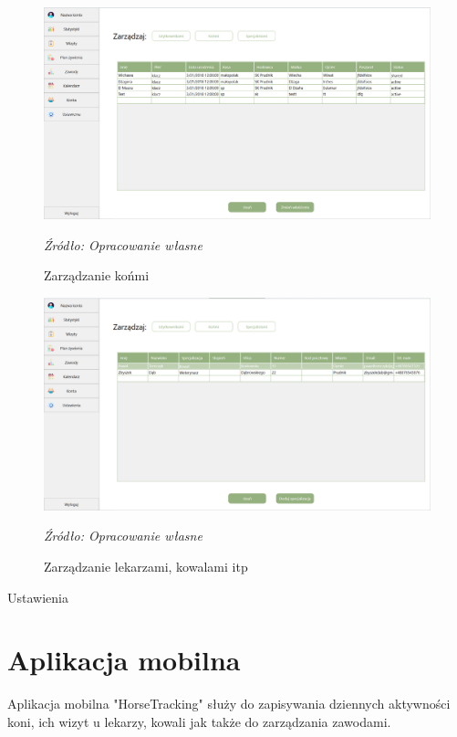 \documentclass[12pt,oneside]{report}
\begin{document}
\begin{figure}[H]
\centering
\includegraphics[scale=0.4]{ZarzadzanieKonmi}
\caption{Zarządzanie końmi}
\textit{Źródło: Opracowanie własne}
\label{Konie}
\end{figure}
\begin{figure}[H]
\centering
\includegraphics[scale=0.4]{ZarzadzanieSpecjalistami}
\caption{Zarządzanie lekarzami, kowalami itp}
\textit{Źródło: Opracowanie własne}
\label{Specjalisci}
\end{figure}


{\color{red} Ustawienia}
\newpage
\section{Aplikacja mobilna}
Aplikacja mobilna "HorseTracking" służy do zapisywania dziennych aktywności koni, ich wizyt u lekarzy, kowali jak także do zarządzania zawodami.
\end{document}

